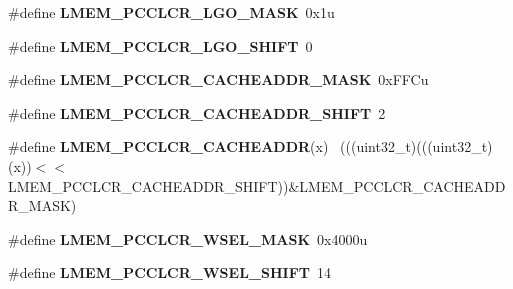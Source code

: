 \begin{DoxyCompactItemize}
\item 
\hypertarget{group___l_m_e_m___register___masks_gaa01a907f55347e38d2f51bb1b7730cba}{}\#define {\bfseries L\+M\+E\+M\+\_\+\+P\+C\+C\+L\+C\+R\+\_\+\+L\+G\+O\+\_\+\+M\+A\+S\+K}~0x1u\label{group___l_m_e_m___register___masks_gaa01a907f55347e38d2f51bb1b7730cba}

\item 
\hypertarget{group___l_m_e_m___register___masks_ga78aff85a7126ce0b78b944071cf6889d}{}\#define {\bfseries L\+M\+E\+M\+\_\+\+P\+C\+C\+L\+C\+R\+\_\+\+L\+G\+O\+\_\+\+S\+H\+I\+F\+T}~0\label{group___l_m_e_m___register___masks_ga78aff85a7126ce0b78b944071cf6889d}

\item 
\hypertarget{group___l_m_e_m___register___masks_gaab883c9ecf2c33ecf91b094219a82597}{}\#define {\bfseries L\+M\+E\+M\+\_\+\+P\+C\+C\+L\+C\+R\+\_\+\+C\+A\+C\+H\+E\+A\+D\+D\+R\+\_\+\+M\+A\+S\+K}~0x\+F\+F\+Cu\label{group___l_m_e_m___register___masks_gaab883c9ecf2c33ecf91b094219a82597}

\item 
\hypertarget{group___l_m_e_m___register___masks_ga3ed6367eaff84c840b71f149f9129aee}{}\#define {\bfseries L\+M\+E\+M\+\_\+\+P\+C\+C\+L\+C\+R\+\_\+\+C\+A\+C\+H\+E\+A\+D\+D\+R\+\_\+\+S\+H\+I\+F\+T}~2\label{group___l_m_e_m___register___masks_ga3ed6367eaff84c840b71f149f9129aee}

\item 
\hypertarget{group___l_m_e_m___register___masks_ga2c6b542d1b60212e2a6be2155344fcdf}{}\#define {\bfseries L\+M\+E\+M\+\_\+\+P\+C\+C\+L\+C\+R\+\_\+\+C\+A\+C\+H\+E\+A\+D\+D\+R}(x)                              ~(((uint32\+\_\+t)(((uint32\+\_\+t)(x))$<$$<$L\+M\+E\+M\+\_\+\+P\+C\+C\+L\+C\+R\+\_\+\+C\+A\+C\+H\+E\+A\+D\+D\+R\+\_\+\+S\+H\+I\+F\+T))\&L\+M\+E\+M\+\_\+\+P\+C\+C\+L\+C\+R\+\_\+\+C\+A\+C\+H\+E\+A\+D\+D\+R\+\_\+\+M\+A\+S\+K)\label{group___l_m_e_m___register___masks_ga2c6b542d1b60212e2a6be2155344fcdf}

\item 
\hypertarget{group___l_m_e_m___register___masks_ga94b957f764ef21f57e73b51c73c4253c}{}\#define {\bfseries L\+M\+E\+M\+\_\+\+P\+C\+C\+L\+C\+R\+\_\+\+W\+S\+E\+L\+\_\+\+M\+A\+S\+K}~0x4000u\label{group___l_m_e_m___register___masks_ga94b957f764ef21f57e73b51c73c4253c}

\item 
\hypertarget{group___l_m_e_m___register___masks_gaee05195999730fff50289cf438d84f3e}{}\#define {\bfseries L\+M\+E\+M\+\_\+\+P\+C\+C\+L\+C\+R\+\_\+\+W\+S\+E\+L\+\_\+\+S\+H\+I\+F\+T}~14\label{group___l_m_e_m___register___masks_gaee05195999730fff50289cf438d84f3e}


\end{DoxyCompactItemize}
